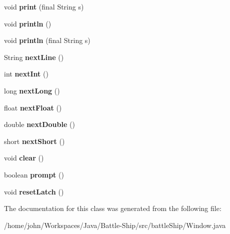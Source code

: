 \begin{DoxyCompactItemize}
\item 
\hypertarget{classbattleShip_1_1Window_ac820eeb047f63e50b38ed572e7bea2a3}{void {\bfseries print} (final String s)}\label{classbattleShip_1_1Window_ac820eeb047f63e50b38ed572e7bea2a3}

\item 
\hypertarget{classbattleShip_1_1Window_a63d6fe9640b210238e4d1b9fd04effc7}{void {\bfseries println} ()}\label{classbattleShip_1_1Window_a63d6fe9640b210238e4d1b9fd04effc7}

\item 
\hypertarget{classbattleShip_1_1Window_abdaeade215ae95f8684ec6450a672c6d}{void {\bfseries println} (final String s)}\label{classbattleShip_1_1Window_abdaeade215ae95f8684ec6450a672c6d}

\item 
\hypertarget{classbattleShip_1_1Window_abf2ff42e8976cd34ce6ca1f8e4d00268}{String {\bfseries next\-Line} ()}\label{classbattleShip_1_1Window_abf2ff42e8976cd34ce6ca1f8e4d00268}

\item 
\hypertarget{classbattleShip_1_1Window_ae954372a5fc388c81b2b428bc5c01f7f}{int {\bfseries next\-Int} ()}\label{classbattleShip_1_1Window_ae954372a5fc388c81b2b428bc5c01f7f}

\item 
\hypertarget{classbattleShip_1_1Window_a683f5733202653718286209f6e7ab5ca}{long {\bfseries next\-Long} ()}\label{classbattleShip_1_1Window_a683f5733202653718286209f6e7ab5ca}

\item 
\hypertarget{classbattleShip_1_1Window_af3d2929699fbf63c1ea7a05a1e0fd2ee}{float {\bfseries next\-Float} ()}\label{classbattleShip_1_1Window_af3d2929699fbf63c1ea7a05a1e0fd2ee}

\item 
\hypertarget{classbattleShip_1_1Window_a2a798787bb6e52698ddcc1479b07c751}{double {\bfseries next\-Double} ()}\label{classbattleShip_1_1Window_a2a798787bb6e52698ddcc1479b07c751}

\item 
\hypertarget{classbattleShip_1_1Window_a444c42bf30aefa08006bb2c80b2dedbf}{short {\bfseries next\-Short} ()}\label{classbattleShip_1_1Window_a444c42bf30aefa08006bb2c80b2dedbf}

\item 
\hypertarget{classbattleShip_1_1Window_a16f9f3d7c222bb91dd1a9c6d7f131941}{void {\bfseries clear} ()}\label{classbattleShip_1_1Window_a16f9f3d7c222bb91dd1a9c6d7f131941}

\item 
\hypertarget{classbattleShip_1_1Window_a233909005709f7c5063b352ccdd41af0}{boolean {\bfseries prompt} ()}\label{classbattleShip_1_1Window_a233909005709f7c5063b352ccdd41af0}

\item 
\hypertarget{classbattleShip_1_1Window_aee61a29762bf0fa617894920f836326b}{void {\bfseries reset\-Latch} ()}\label{classbattleShip_1_1Window_aee61a29762bf0fa617894920f836326b}

\end{DoxyCompactItemize}


The documentation for this class was generated from the following file\-:\begin{DoxyCompactItemize}
\item 
/home/john/\-Workspaces/\-Java/\-Battle-\/\-Ship/src/battle\-Ship/Window.\-java\end{DoxyCompactItemize}
